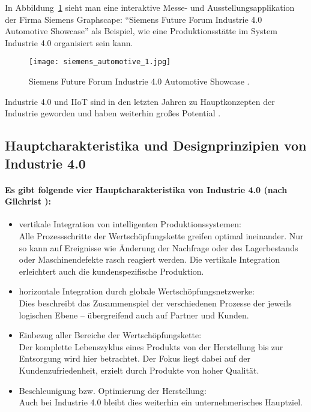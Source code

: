 In Abbildung~\ref{fig:AutomotiveShowcase} sieht man eine interaktive Messe- und Ausstellungsapplikation der Firma Siemens Graphscape: "`Siemens Future Forum Industrie 4.0 Automotive Showcase"' als Beispiel, wie eine Produktionsstätte im System Industrie 4.0 organisiert sein kann.

\begin{figure}%
\centering
\texttt{[image: siemens\_automotive\_1.jpg]} 
\caption{Siemens Future Forum Industrie 4.0 Automotive Showcase \cite{Siemens}.}
\label{fig:AutomotiveShowcase}
\end{figure}

Industrie 4.0 und \acl{IIoT} sind in den letzten Jahren zu Hauptkonzepten der Industrie geworden und haben weiterhin großes Potential \parencite{gilchrist2016industry}.

\subsection{Hauptcharakteristika und Designprinzipien von Industrie 4.0}
\paragraph{Es gibt folgende vier Hauptcharakteristika von Industrie 4.0 (nach Gilchrist \parencite{gilchrist2016industry}):}
\begin{itemize}
\item vertikale Integration von intelligenten Produktionssystemen:\\
Alle Prozessschritte der Wertschöpfungskette greifen optimal ineinander. Nur so kann auf Ereignisse wie Änderung der Nachfrage oder des Lagerbestands oder  Maschinendefekte rasch reagiert werden. Die vertikale Integration erleichtert auch die kundenspezifische Produktion. 
\item horizontale Integration durch globale Wertschöpfungsnetzwerke:\\
Dies beschreibt das Zusammenspiel der verschiedenen Prozesse der jeweils logischen Ebene -- übergreifend auch auf Partner und Kunden.
\item Einbezug aller Bereiche der Wertschöpfungskette:\\
Der komplette Lebenszyklus eines Produkts von der Herstellung bis zur Entsorgung wird hier betrachtet. Der Fokus liegt dabei auf der Kundenzufriedenheit, erzielt durch Produkte von hoher Qualität.
\item Beschleunigung bzw. Optimierung der Herstellung:\\
Auch bei Industrie 4.0 bleibt dies weiterhin ein unternehmerisches Hauptziel.
\end{itemize}
\vspace{\baselineskip}

